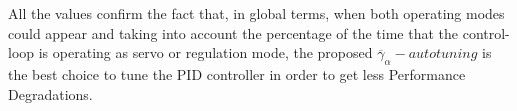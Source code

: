 All the values confirm the fact that, in global terms, when both
operating modes could appear and taking into account the
percentage of the time that the control-loop is operating as servo
or regulation mode, the proposed
$\overline{\gamma}_{\alpha}-autotuning$ is the best choice to tune
the PID controller in order to get less Performance Degradations.



